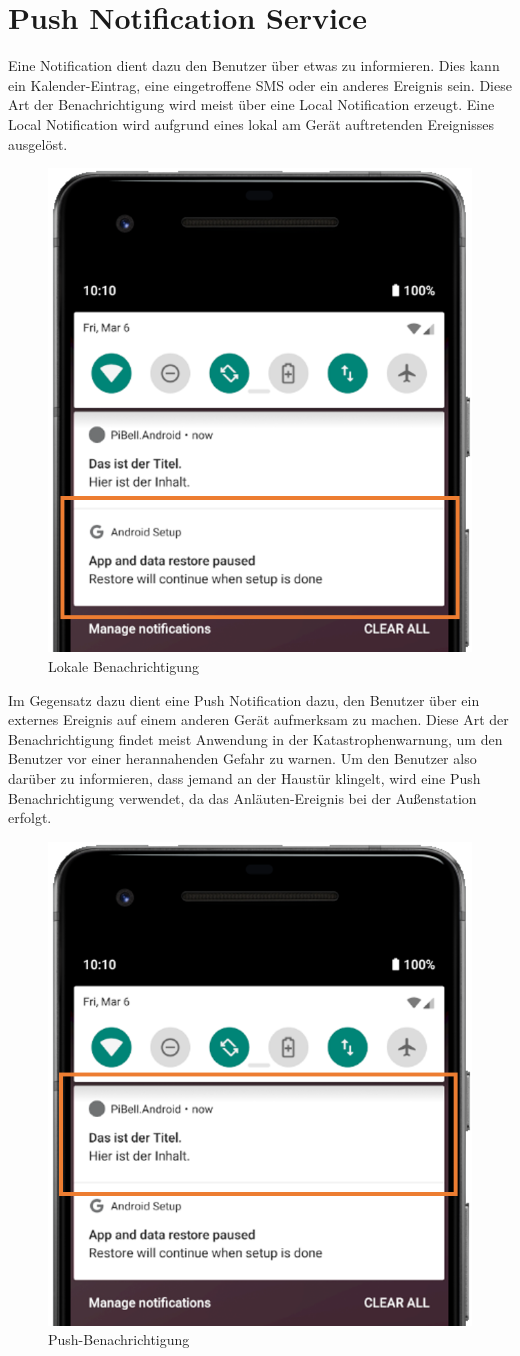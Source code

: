 \section{Push Notification Service}
Eine Notification dient dazu den Benutzer über etwas zu informieren. Dies kann ein Kalender-Eintrag, eine eingetroffene SMS oder ein anderes Ereignis sein. Diese Art der Benachrichtigung wird meist über eine Local Notification erzeugt. Eine Local Notification wird aufgrund eines lokal am Gerät auftretenden Ereignisses ausgelöst.
\begin{figure}[H]
    \centering\includegraphics[width=.5\linewidth]{images/xamarin/LocalNotification.png}
    \caption{Lokale Benachrichtigung}
\end{figure}

Im Gegensatz dazu dient eine Push Notification dazu, den Benutzer über ein externes Ereignis auf einem anderen Gerät aufmerksam zu machen. Diese Art der Benachrichtigung findet meist Anwendung in der Katastrophenwarnung, um den Benutzer vor einer herannahenden Gefahr zu warnen.
Um den Benutzer also darüber zu informieren, dass jemand an der Haustür klingelt, wird eine Push Benachrichtigung verwendet, da das Anläuten-Ereignis bei der Außenstation erfolgt.
\begin{figure}[H]
    \centering\includegraphics[width=.5\linewidth]{images/xamarin/PushNotification.png}
    \caption{Push-Benachrichtigung}
\end{figure}

